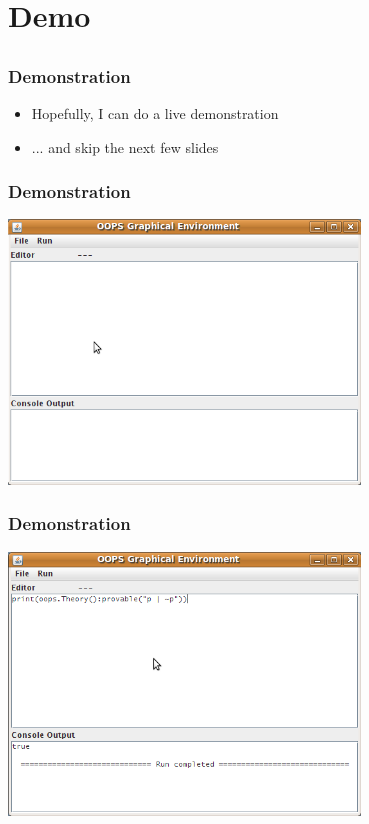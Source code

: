 \documentclass{beamer}
\begin{document}
\section{Demo}
\subsection{}

\begin{frame}
\frametitle{Demonstration}
\begin{itemize}
\item Hopefully, I can do a live demonstration
\item ... and skip the next few slides
\end{itemize}
\end{frame}

\begin{frame}
\frametitle{Demonstration}
\includegraphics[width=0.7\textwidth]{demo01}
\end{frame}

\begin{frame}
\frametitle{Demonstration}
\includegraphics[width=0.7\textwidth]{demo02}
\end{frame}
\end{document}
